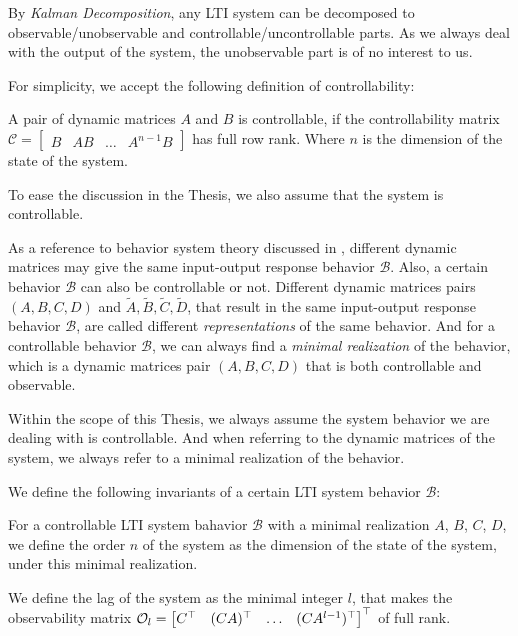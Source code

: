 By \emph{Kalman Decomposition}, any LTI system can be decomposed to observable/unobservable and controllable/uncontrollable parts.
As we always deal with the output of the system, the unobservable part is of no interest to us.

For simplicity, we accept the following definition of controllability:

\begin{definition}\label{def:lti-controllability}
    A pair of dynamic matrices $A$ and $B$ is controllable, if the controllability matrix $\mathcal{C} = \begin{bmatrix} B & A B & \ldots & A^{n-1} B \end{bmatrix}$ has full row rank.
    Where $n$ is the dimension of the state of the system.
\end{definition}

To ease the discussion in the Thesis, we also assume that the system is controllable.

As a reference to behavior system theory discussed in \cite{markovsky_behavioral_2021}, different dynamic matrices may give the same input-output response behavior $\mathscr{B}$.
Also, a certain behavior $\mathscr{B}$ can also be controllable or not.
Different dynamic matrices pairs $(A, B, C, D)$ and $\tilde{A}, \tilde{B}, \tilde{C}, \tilde{D}$, that result in the same input-output response behavior $\mathscr{B}$, are called different \emph{representations} of the same behavior.
And for a controllable behavior $\mathscr{B}$, we can always find a \emph{minimal realization} of the behavior, which is a dynamic matrices pair $(A, B, C, D)$ that is both controllable and observable.

Within the scope of this Thesis, we always assume the system behavior we are dealing with is controllable.
And when referring to the dynamic matrices of the system, we always refer to a minimal realization of the behavior.

We define the following invariants of a certain LTI system behavior $\mathscr{B}$:

\begin{definition}\label{def:order-lag}
    For a controllable LTI system bahavior $\mathscr{B}$ with a minimal realization $A$, $B$, $C$, $D$, we define the order $n$ of the system as the dimension of the state of the system, under this minimal realization.

    We define the lag of the system as the minimal integer $l$, that makes the observability matrix $\mathcal{O}_l = \begin{bmatrix} C^{\top} & (C A)^{\top} & \ldots & (C A^{l-1})^{\top} \end{bmatrix}^{\top}$ of full rank.
\end{definition}

